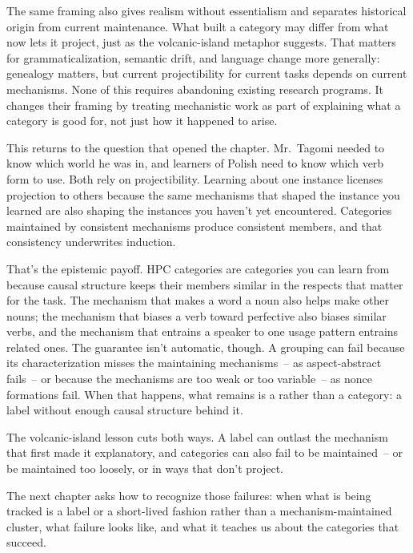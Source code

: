 The same framing also gives realism without essentialism and separates historical origin from current maintenance. What built a category may differ from what now lets it project, just as the volcanic-island metaphor suggests. That matters for grammaticalization, semantic drift, and language change more generally: genealogy matters, but current projectibility for current tasks depends on current mechanisms. None of this requires abandoning existing research programs. It changes their framing by treating mechanistic work as part of explaining what a category is good for, not just how it happened to arise.

This returns to the question that opened the chapter. Mr.~Tagomi needed to know which world he was in, and learners of Polish need to know which verb form to use. Both rely on projectibility. Learning about one instance licenses projection to others because the same mechanisms that shaped the instance you learned are also shaping the instances you haven't yet encountered. Categories maintained by consistent mechanisms produce consistent members, and that consistency underwrites induction.

That's the epistemic payoff. HPC categories are categories you can learn from because causal structure keeps their members similar in the respects that matter for the task. The mechanism that makes a word a noun also helps make other nouns; the mechanism that biases a verb toward perfective also biases similar verbs, and the mechanism that entrains a speaker to one usage pattern entrains related ones. The guarantee isn't automatic, though. A grouping can fail because its characterization misses the maintaining mechanisms~-- as aspect-abstract fails~-- or because the mechanisms are too weak or too variable~-- as nonce formations fail. When that happens, what remains is a  rather than a category: a label without enough causal structure behind it.


The volcanic-island lesson cuts both ways. A label can outlast the mechanism that first made it explanatory, and categories can also fail to be maintained~-- or be maintained too loosely, or in ways that don't project.

The next chapter asks how to recognize those failures: when what is being tracked is a label or a short-lived fashion rather than a mechanism-maintained cluster, what failure looks like, and what it teaches us about the categories that succeed.


